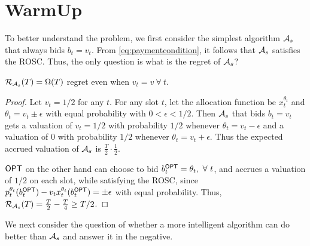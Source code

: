 \section{WarmUp}\label{sec:warmup}
To better understand the problem, we first consider the simplest algorithm $\mathcal{A}_s$ that always bids $b_t=v_t$. From \eqref{eq:paymentcondition}, it follows that $\mathcal{A}_s$ satisfies the ROSC. Thus, the 
only question is what is the regret of $\mathcal{A}_s$?

\begin{lemma} $\mathcal{R}_{\mathcal{A}_s}(T) =\Omega(T)$ regret even when $v_t=v\  \forall  \ t$.
\end{lemma}
\begin{proof}
Let $v_t = 1/2$ for any $t$. For any slot $t$, let  the allocation function be $x_t^{\theta_t}$ and $\theta_t = v_t \pm \epsilon$ with equal probability with $0 < \epsilon < 1/2$. Then $\mathcal{A}_s$ that bids $b_t=v_t$ gets a valuation of $v_t=1/2$ with probability $1/2$ whenever $\theta_t=v_t-\epsilon$ and a valuation of $0$ with probability $1/2$ whenever $\theta_t=v_t+\epsilon$. Thus the expected accrued valuation of $\mathcal{A}_s$ is $\frac{T}{2} \cdot \frac{1}{2}$.

$\mathsf{OPT}$ on the other hand can choose to bid $b_t^\opt=\theta_t, \ \forall \ t$,  and accrues a valuation of $1/2$ on each slot, while satisfying the ROSC, since $p_t^{\theta_t}(b^{\mathsf{OPT}}_t) - v_t x_t^{\theta_t}(b^{\mathsf{OPT}}_t) = \pm \epsilon$ with equal probability.
Thus, $\mathcal{R}_{\mathcal{A}_s}(T) =  \frac{T}{2} - \frac{T}{4} \ge T/2$.
\end{proof}
We next consider the question of whether a more intelligent algorithm can do better than $\mathcal{A}_s$ and answer it in the negative.

